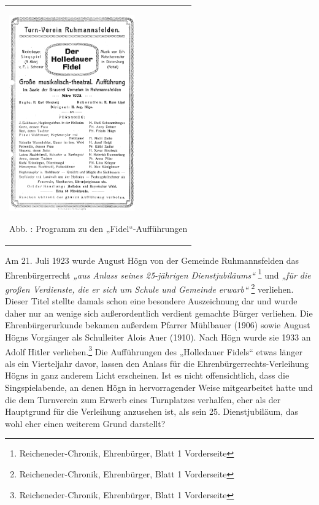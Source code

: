 \documentclass[a4paper]{article}
\newcommand\textstyleZitate[1]{\textit{#1}}
\newcommand\textstyleFunotenTextZchn[1]{#1}
\newcounter{Abb}
\renewcommand\theAbb{\arabic{Abb}}
\begin{document}
\begin{center}
\begin{minipage}{5.794cm}
\begin{center}
\tablefirsthead{}
\tablehead{}
\tabletail{}
\tablelasttail{}
\begin{supertabular}{m{5.5940003cm}}

\includegraphics[width=5.412cm,height=8.456cm]{pictures/zulassungsarbeit-img022.png}

Abb. \stepcounter{Abb}{\theAbb}: Programm zu den „Fidel“-Aufführungen\\
\end{supertabular}
\end{center}
\end{minipage}
\end{center}
Am 21. Juli 1923 wurde August Högn von der Gemeinde Ruhmannsfelden das
Ehrenbürgerrecht \textstyleZitate{„aus Anlass seines 25-jährigen
Dienstjubiläums“ }\footnote{
\textstyleFunotenTextZchn{Reicheneder-Chronik, Ehrenbürger, Blatt 1
Vorderseite}} und \textstyleZitate{„für die großen Verdienste, die er
sich um Schule und Gemeinde erwarb“ }\footnote{
\textstyleFunotenTextZchn{Reicheneder-Chronik, Ehrenbürger, Blatt 1
Vorderseite}} verliehen. Dieser Titel stellte damals schon eine
besondere Auszeichnung dar und wurde daher nur an wenige sich
außerordentlich verdient gemachte Bürger verliehen. Die
Ehrenbürgerurkunde bekamen außerdem Pfarrer Mühlbauer (1906) sowie
August Högns Vorgänger als Schulleiter Alois Auer (1910). Nach Högn
wurde sie 1933 an Adolf Hitler verliehen.\footnote{
\textstyleFunotenTextZchn{Reicheneder-Chronik, Ehrenbürger, Blatt 1
Vorderseite}} Die Aufführungen des „Holledauer Fidels“ etwas länger als
ein Vierteljahr davor, lassen den Anlass für die
Ehrenbürgerrechts-Verleihung Högns in ganz anderem Licht erscheinen.
Ist es nicht offensichtlich, dass die Singspielabende, an denen Högn in
hervorragender Weise mitgearbeitet hatte und die dem Turnverein zum
Erwerb eines Turnplatzes verhalfen, eher als der Hauptgrund für die
Verleihung anzusehen ist, als sein 25. Dienstjubiläum, das wohl eher
einen weiterem Grund darstellt?
\end{document}
